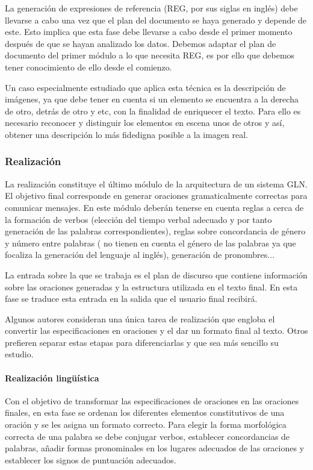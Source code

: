 La generación de expresiones de referencia (REG, por sus siglas en inglés) debe llevarse a cabo una vez que el plan del documento se haya generado y depende de este. Esto implica que esta fase debe llevarse a cabo desde el primer momento después de que se hayan analizado los datos. Debemos adaptar el plan de documento del primer módulo a lo que necesita REG, es por ello que debemos tener conocimiento de ello desde el comienzo.

Un caso especialmente estudiado que aplica esta técnica es la descripción de imágenes, ya que debe tener en cuenta si un elemento se encuentra a la derecha de otro, detrás de otro y etc, con la finalidad de enriquecer el texto. Para ello es necesario reconocer y distinguir los elementos en escena unos de otros y así, obtener una descripción lo más fidedigna posible a la imagen real.

\subsubsection{Realización}
La realización constituye el último módulo de la arquitectura de un sistema GLN. El objetivo final corresponde en generar oraciones gramaticalmente correctas para comunicar mensajes. En este módulo deberán tenerse en cuenta reglas a cerca de la formación de verbos (elección del tiempo verbal adecuado y por tanto generación de las palabras correspondientes), reglas sobre concordancia de género y número entre palabras (\cite{reiter1997building} no tienen en cuenta el género de las palabras ya que focaliza la generación del lenguaje al inglés), generación de pronombres...
 
La entrada sobre la que se trabaja es el plan de discurso que contiene información sobre las oraciones generadas y la estructura utilizada en el texto final. En esta fase se traduce esta entrada en la salida que el usuario final recibirá.

Algunos autores consideran una única tarea de realización que engloba el convertir las especificaciones en oraciones y el dar un formato final al texto. Otros prefieren separar estas etapas para diferenciarlas y que sea más sencillo su estudio.

\paragraph{Realización lingüística}\hfill

Con el objetivo de transformar las especificaciones de oraciones en las oraciones finales, en esta fase se ordenan los diferentes elementos constitutivos de una oración y se les asigna un formato correcto. Para elegir la forma morfológica correcta de una palabra se debe conjugar verbos, establecer concordancias de palabras, añadir formas pronominales en los lugares adecuados de las oraciones y establecer los signos de puntuación adecuados. 

